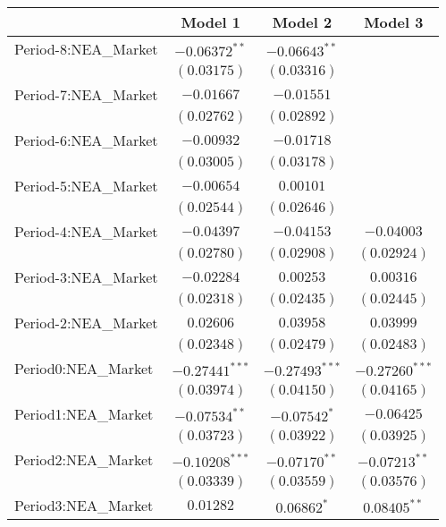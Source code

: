 
\begin{tabular}{l c c c}
\hline
 & Model 1 & Model 2 & Model 3 \\
\hline
Period-8:NEA\_Market & $-0.06372^{**}$  & $-0.06643^{**}$  &                  \\
                     & $(0.03175)$      & $(0.03316)$      &                  \\
Period-7:NEA\_Market & $-0.01667$       & $-0.01551$       &                  \\
                     & $(0.02762)$      & $(0.02892)$      &                  \\
Period-6:NEA\_Market & $-0.00932$       & $-0.01718$       &                  \\
                     & $(0.03005)$      & $(0.03178)$      &                  \\
Period-5:NEA\_Market & $-0.00654$       & $0.00101$        &                  \\
                     & $(0.02544)$      & $(0.02646)$      &                  \\
Period-4:NEA\_Market & $-0.04397$       & $-0.04153$       & $-0.04003$       \\
                     & $(0.02780)$      & $(0.02908)$      & $(0.02924)$      \\
Period-3:NEA\_Market & $-0.02284$       & $0.00253$        & $0.00316$        \\
                     & $(0.02318)$      & $(0.02435)$      & $(0.02445)$      \\
Period-2:NEA\_Market & $0.02606$        & $0.03958$        & $0.03999$        \\
                     & $(0.02348)$      & $(0.02479)$      & $(0.02483)$      \\
Period0:NEA\_Market  & $-0.27441^{***}$ & $-0.27493^{***}$ & $-0.27260^{***}$ \\
                     & $(0.03974)$      & $(0.04150)$      & $(0.04165)$      \\
Period1:NEA\_Market  & $-0.07534^{**}$  & $-0.07542^{*}$   & $-0.06425$       \\
                     & $(0.03723)$      & $(0.03922)$      & $(0.03925)$      \\
Period2:NEA\_Market  & $-0.10208^{***}$ & $-0.07170^{**}$  & $-0.07213^{**}$  \\
                     & $(0.03339)$      & $(0.03559)$      & $(0.03576)$      \\
Period3:NEA\_Market  & $0.01282$        & $0.06862^{*}$    & $0.08405^{**}$   \\

\end{tabular}
